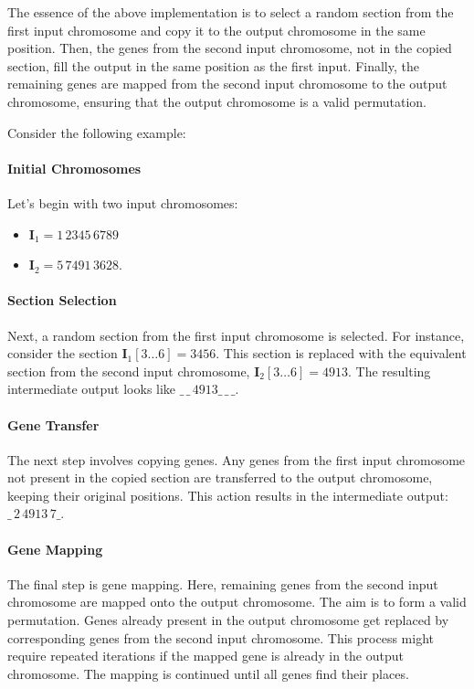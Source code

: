   The essence of the above implementation is to select a random section from the
  first input chromosome and copy it to the output chromosome in the same
  position. Then, the genes from the second input chromosome, not in the copied
  section, fill the output in the same position as the first input. Finally,
  the remaining genes are mapped from the second input chromosome to the
  output chromosome, ensuring that the output chromosome is a valid
  permutation. 
  
  Consider the following example:
  \paragraph{Initial Chromosomes}

    Let's begin with two input chromosomes:

    \begin{itemize}
      \item \(\mathbf{I}_1 = 1\,2345\,6789\)
      \item \(\mathbf{I}_2 = 5\,7491\,3628\).
    \end{itemize}

  \paragraph{Section Selection}

    Next, a random section from the first input chromosome is selected. For 
    instance, consider the section \(\textbf{I}_1[3\dots6] = 3456\). This 
    section is replaced with the equivalent section from the second input 
    chromosome, \(\textbf{I}_2[3\dots6] = 4913\). The resulting intermediate 
    output looks like \(\_\,\_\,4913\_\,\_\,\_\).

  \paragraph{Gene Transfer}

    The next step involves copying genes. Any genes from the first input 
    chromosome not present in the copied section are transferred to the output 
    chromosome, keeping their original positions. This action results in the 
    intermediate output: \(\_\,2\,4913\,7\_\).

  \paragraph{Gene Mapping}
    The final step is gene mapping. Here, remaining genes from the second input 
    chromosome are mapped onto the output chromosome. The aim is to form a valid 
    permutation. Genes already present in the output chromosome get replaced by 
    corresponding genes from the second input chromosome. This process might 
    require repeated iterations if the mapped gene is already in the output 
    chromosome. The mapping is continued until all genes find their places. 

